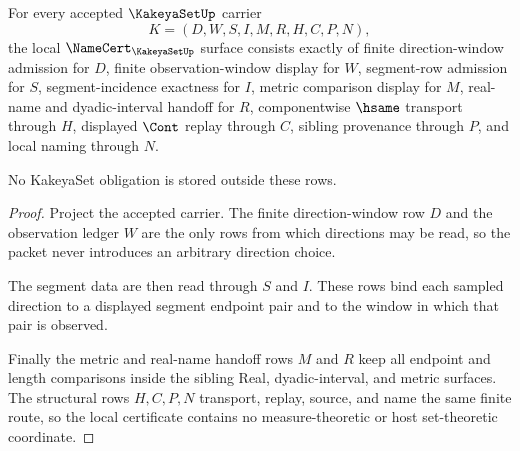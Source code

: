 \begin{theorem}
\label{thm:kakeya-set-namecert-obligations}
For every accepted $\KakeyaSetUp$ carrier
$$
K=(D,W,S,I,M,R,H,C,P,N),
$$
the local $\NameCert_{\KakeyaSetUp}$ surface consists exactly of finite direction-window admission for $D$, finite observation-window display for $W$, segment-row admission for $S$, segment-incidence exactness for $I$, metric comparison display for $M$, real-name and dyadic-interval handoff for $R$, componentwise $\hsame$ transport through $H$, displayed $\Cont$ replay through $C$, sibling provenance through $P$, and local naming through $N$.

No KakeyaSet obligation is stored outside these rows.
\end{theorem}
\begin{proof}
Project the accepted carrier. The finite direction-window row $D$ and the observation ledger $W$ are the only rows from which directions may be read, so the packet never introduces an arbitrary direction choice.

The segment data are then read through $S$ and $I$. These rows bind each sampled direction to a displayed segment endpoint pair and to the window in which that pair is observed.

Finally the metric and real-name handoff rows $M$ and $R$ keep all endpoint and length comparisons inside the sibling Real, dyadic-interval, and metric surfaces. The structural rows $H,C,P,N$ transport, replay, source, and name the same finite route, so the local certificate contains no measure-theoretic or host set-theoretic coordinate.
\end{proof}

